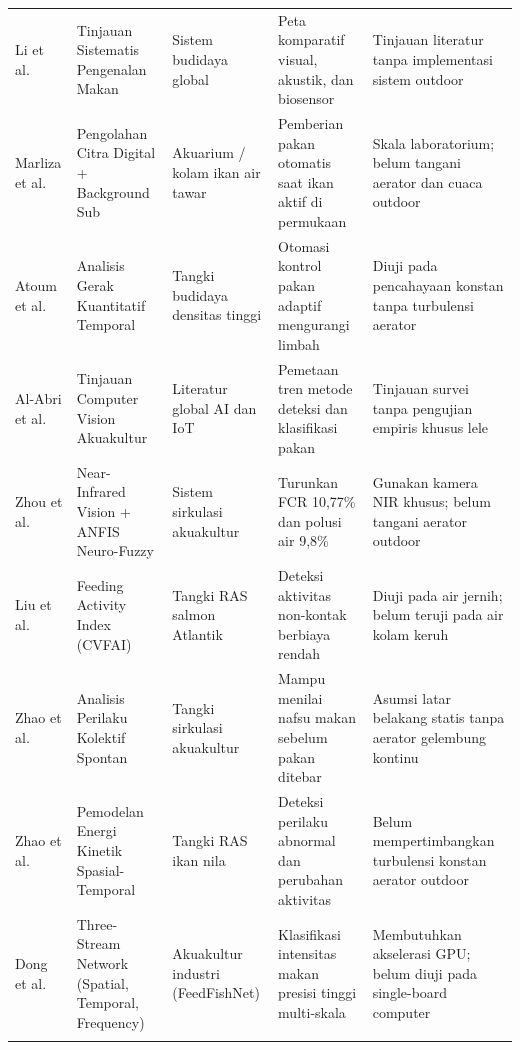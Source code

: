 \begin{small}
\begin{longtable}{p{2.6cm} p{3.2cm} p{2.8cm} p{3.4cm} p{2.6cm}}
{Li et al.~\cite{Li2020}} & Tinjauan Sistematis Pengenalan Makan & Sistem budidaya global & Peta komparatif visual, akustik, dan biosensor & Tinjauan literatur tanpa implementasi sistem outdoor \\
\addlinespace

{Marliza et al.~\cite{Marliza2021}} & Pengolahan Citra Digital + Background Sub & Akuarium / kolam ikan air tawar & Pemberian pakan otomatis saat ikan aktif di permukaan & Skala laboratorium; belum tangani aerator dan cuaca outdoor \\
\addlinespace

{Atoum et al.~\cite{Atoum2015}} & Analisis Gerak Kuantitatif Temporal & Tangki budidaya densitas tinggi & Otomasi kontrol pakan adaptif mengurangi limbah & Diuji pada pencahayaan konstan tanpa turbulensi aerator \\
\addlinespace

{Al-Abri et al.~\cite{Al-Abri2025}} & Tinjauan Computer Vision Akuakultur & Literatur global AI dan IoT & Pemetaan tren metode deteksi dan klasifikasi pakan & Tinjauan survei tanpa pengujian empiris khusus lele \\
\addlinespace

{Zhou et al.~\cite{Zhou2018}} & Near-Infrared Vision + ANFIS Neuro-Fuzzy & Sistem sirkulasi akuakultur & Turunkan FCR 10,77\% dan polusi air 9,8\% & Gunakan kamera NIR khusus; belum tangani aerator outdoor \\
\addlinespace

{Liu et al.~\cite{Liu2014}} & Feeding Activity Index (CVFAI) & Tangki RAS salmon Atlantik & Deteksi aktivitas non-kontak berbiaya rendah & Diuji pada air jernih; belum teruji pada air kolam keruh \\
\addlinespace

{Zhao et al.~\cite{Zhao2017}} & Analisis Perilaku Kolektif Spontan & Tangki sirkulasi akuakultur & Mampu menilai nafsu makan sebelum pakan ditebar & Asumsi latar belakang statis tanpa aerator gelembung kontinu \\
\addlinespace

{Zhao et al.~\cite{Zhao2016}} & Pemodelan Energi Kinetik Spasial-Temporal & Tangki RAS ikan nila & Deteksi perilaku abnormal dan perubahan aktivitas & Belum mempertimbangkan turbulensi konstan aerator outdoor \\
\addlinespace

{Dong et al.~\cite{Dong2024}} & Three-Stream Network (Spatial, Temporal, Frequency) & Akuakultur industri (FeedFishNet) & Klasifikasi intensitas makan presisi tinggi multi-skala & Membutuhkan akselerasi GPU; belum diuji pada single-board computer \\
\addlinespace


\end{longtable}
\end{small}
